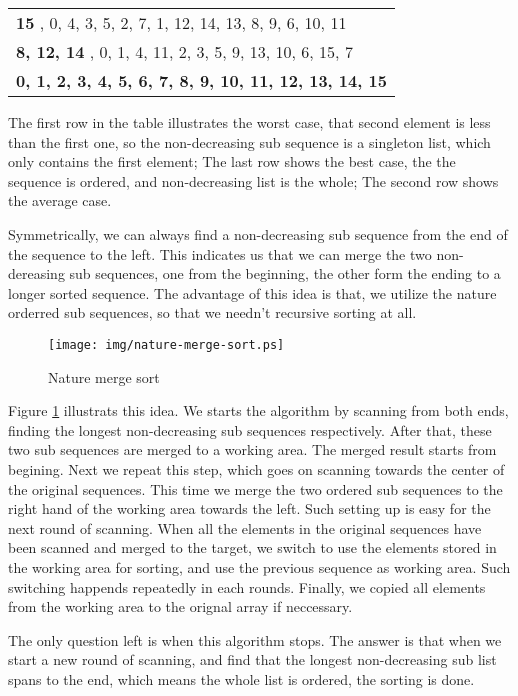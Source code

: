 \documentclass{article}
\begin{document}
\begin{tabular}{ | l |}
\hline
{\bf 15 } , 0, 4, 3, 5, 2, 7, 1, 12, 14, 13, 8, 9, 6, 10, 11 \\
{\bf 8, 12, 14 }, 0, 1, 4, 11, 2, 3, 5, 9, 13, 10, 6, 15, 7 \\
{\bf 0, 1, 2, 3, 4, 5, 6, 7, 8, 9, 10, 11, 12, 13, 14, 15 } \\
\hline
\end{tabular}

The first row in the table illustrates the worst case, that second element is less than the first one,
so the non-decreasing sub sequence is a singleton list, which only contains the first element;
The last row shows the best case, the the sequence is ordered, and non-decreasing list is the whole;
The second row shows the average case.

Symmetrically, we can always find a non-decreasing sub sequence from the end of the sequence
to the left. This indicates us that we can merge the two non-dereasing sub sequences, one
from the beginning, the other form the ending to a longer sorted sequence. The advantage of
this idea is that, we utilize the nature orderred sub sequences, so that we needn't recursive
sorting at all.

\begin{figure}[htbp]
 \centering
 \texttt{[image: img/nature-merge-sort.ps]}
 \caption{Nature merge sort}
 \label{fig:nature-merge-sort}
\end{figure}

Figure \ref{fig:nature-merge-sort} illustrats this idea. We starts the algorithm by scanning
from both ends, finding the longest non-decreasing sub sequences respectively. After that,
these two sub sequences are merged to a working area. The merged result starts from begining.
Next we repeat this step, which goes on scanning towards the center of the original sequences.
This time we merge the two ordered sub sequences to the right hand of the working area towards
the left. Such setting up is easy for the next round of scanning. When all the elements 
in the original sequences have been scanned and merged to the target, we switch to use the 
elements stored in the working area for sorting, and use the previous sequence as working area. 
Such switching happends repeatedly in each rounds. Finally, we copied all elements from the 
working area to the orignal array if neccessary.

The only question left is when this algorithm stops. The answer is that when we start 
a new round of scanning, and find that the longest non-decreasing sub list spans to the
end, which means the whole list is ordered, the sorting is done.
\end{document}
